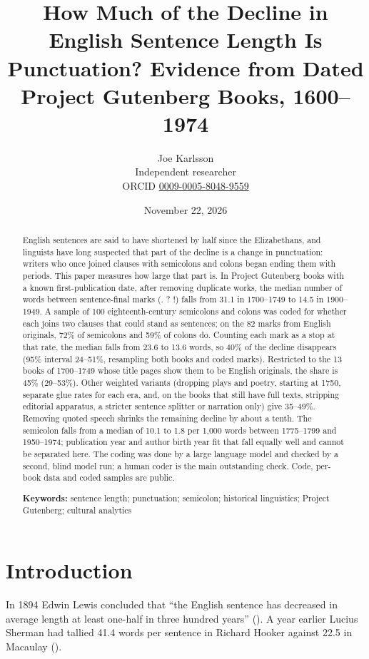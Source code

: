 \documentclass[
  11pt,
]{article}
\title{How Much of the Decline in English Sentence Length Is Punctuation? Evidence from Dated Project Gutenberg Books, 1600--1974}
\author{Joe Karlsson \\ \small Independent researcher \\ \small ORCID \href{https://orcid.org/0009-0005-8048-9559}{0009-0005-8048-9559}}
\date{November 22, 2026}
\begin{document}
\maketitle
\begin{abstract}
English sentences are said to have shortened by half since the Elizabethans, and linguists have long suspected that part of the decline is a change in punctuation: writers who once joined clauses with
semicolons and colons began ending them with periods. This paper measures how large that part is. In Project Gutenberg books with a known first-publication date, after removing duplicate works, the
median number of words between sentence-final marks (. ? !) falls from 31.1 in 1700--1749 to 14.5 in 1900--1949. A sample of 100 eighteenth-century semicolons and colons was coded for whether each
joins two clauses that could stand as sentences; on the 82 marks from English originals, 72\% of semicolons and 59\% of colons do. Counting each mark as a stop at that rate, the median falls from 23.6
to 13.6 words, so 40\% of the decline disappears (95\% interval 24--51\%, resampling both books and coded marks). Restricted to the 13 books of 1700--1749 whose title pages show them to be English
originals, the share is 45\% (29--53\%). Other weighted variants (dropping plays and poetry, starting at 1750, separate glue rates for each era, and, on the books that still have full texts, stripping
editorial apparatus, a stricter sentence splitter or narration only) give 35--49\%. Removing quoted speech shrinks the remaining decline by about a tenth. The semicolon falls from a median of 10.1 to
1.8 per 1,000 words between 1775--1799 and 1950--1974; publication year and author birth year fit that fall equally well and cannot be separated here. The coding was done by a large language model and
checked by a second, blind model run; a human coder is the main outstanding check. Code, per-book data and coded samples are public.

\textbf{Keywords:} sentence length; punctuation; semicolon; historical linguistics; Project Gutenberg; cultural analytics
\end{abstract}

\section{Introduction}\label{introduction}

In 1894 Edwin Lewis concluded that ``the English sentence has decreased in average length at least one-half in three hundred years'' (). A year earlier Lucius
Sherman had tallied 41.4 words per sentence in Richard Hooker against 22.5 in Macaulay ().
\end{document}
